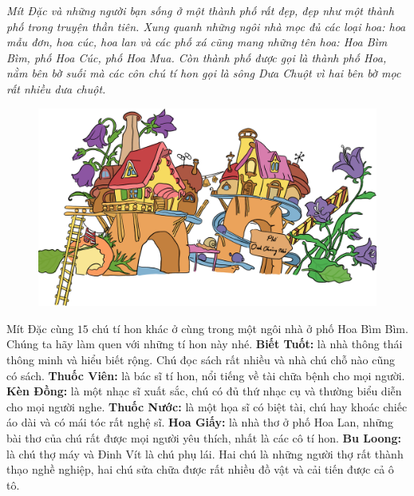 	\begin{multicols}{2}
		\textit{Mít Đặc và những người bạn sống ở một thành phố rất đẹp, đẹp như một thành phố trong truyện thần tiên. Xung quanh những ngôi nhà mọc đủ các loại hoa: hoa mẫu đơn, hoa cúc, hoa lan và các phố xá cũng mang những tên hoa: Hoa Bìm Bìm, phố Hoa Cúc, phố Hoa Mua. Còn thành phố được gọi là thành phố Hoa, nằm bên bờ suối mà các côn chú tí hon gọi là sông Dưa Chuột vì hai bên bờ mọc rất nhiều dưa chuột.}
		\begin{figure}[H]
			\centering
			\vspace*{-5pt}
			\captionsetup{labelformat= empty, justification=centering}
			\includegraphics[width=1\linewidth]{Hinh1_TPHoa}
			\vspace*{-5pt}
		\end{figure}
	\end{multicols}
	Mít Đặc cùng $15$ chú tí hon khác ở cùng trong một ngôi nhà ở phố Hoa Bìm Bìm. Chúng ta hãy làm quen với những tí hon này nhé.
	\vskip 0.1cm
	\textbf{\color{toancuabi}Biết Tuốt:} là nhà thông thái thông minh và hiểu biết rộng. Chú đọc sách rất nhiều và nhà chú chỗ nào cũng có sách.
	\vskip 0.1cm
	\textbf{\color{toancuabi}Thuốc Viên:} là bác sĩ tí hon, nổi tiếng về tài chữa bệnh cho mọi người.
	\vskip 0.1cm
	\textbf{\color{toancuabi}Kèn Đồng:} là một nhạc sĩ xuất sắc, chú có đủ thứ nhạc cụ và thường biểu diễn cho mọi người nghe.
	\vskip 0.1cm
	\textbf{\color{toancuabi}Thuốc Nước:} là một họa sĩ có biệt tài, chú hay khoác chiếc áo dài và có mái tóc rất nghệ sĩ.
	\vskip 0.1cm
	\textbf{\color{toancuabi}Hoa Giấy:} là nhà thơ ở phố Hoa Lan, những bài thơ của chú rất được mọi người yêu thích, nhất là các cô tí hon.
	\vskip 0.1cm
	\textbf{\color{toancuabi}Bu Loong:} là chú thợ máy và Đinh Vít là chú phụ lái. Hai chú là những người thợ rất thành thạo nghề nghiệp, hai chú sửa chữa được rất nhiều đồ vật và cải tiến được cả ô tô.
